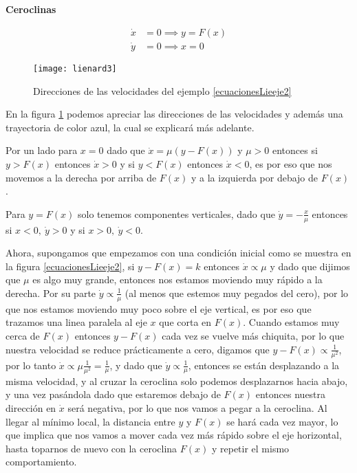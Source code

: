 \begin{ejemplo}
	\textbf{Ceroclinas}

	\begin{equation*}
		\begin{split}
			\dot{x} &= 0 \implies y = F(x) \\
			\dot{y} &= 0 \implies x=0 
		\end{split}
	\end{equation*}

	\begin{figure}[H]
		\centering
		\texttt{[image: lienard3]}
		\caption{Direcciones de las velocidades del ejemplo \ref{ecuacionesLieeje2} }
		\label{lienard3im} 
	\end{figure}
	En la figura \ref{lienard3im} podemos apreciar las direcciones de las velocidades y además una trayectoria de color azul, la cual se explicará más adelante.
\vspace{2mm}

	Por un lado para $x=0$ dado que $\dot{x}=\mu(y-F(x))$ y $ \mu > 0$ entonces si $y>F(x)$ entonces  $\dot{x}>0$ y si $y<F(x)$ entonces  $\dot{x}<0$, es por eso que nos movemos a la derecha por arriba de $F(x)$ y a la izquierda por debajo de  $F(x)$.
\vspace{2mm}

Para $y=F(x)$ solo tenemos componentes verticales, dado que $\dot{y}=-\frac{x}{\mu}$ entonces si $x<0,\ \dot{y}>0$ y si $x>0,\ \dot{y}<0$. 
\vspace{2mm}

Ahora, supongamos que empezamos con una condición inicial como se muestra en la figura \ref{ecuacionesLieeje2}, si $y-F(x) = k$ entonces  $ \dot{x} \propto \mu$ y dado que dijimos que $ \mu$ es algo muy grande, entonces nos estamos moviendo muy rápido a la derecha. Por su parte $\dot{y} \propto \frac{1}{\mu}$ (al menos que estemos muy pegados del cero), por lo que nos estamos moviendo muy poco sobre el eje vertical, es por eso que trazamos una linea paralela al eje $x$ que corta en  $F(x)$. Cuando estamos muy cerca de  $F(x)$ entonces  $y-F(x)$ cada vez se vuelve más chiquita, por lo que nuestra velocidad se reduce prácticamente a cero, digamos que  $y-F(x) \propto \frac{1}{\mu^2}$, por lo tanto $\dot{x} \propto \mu \frac{1}{\mu^2} = \frac{1}{\mu}$, y dado que $\dot{y} \propto \frac{1}{\mu}$, entonces se están desplazando a la misma velocidad, y al cruzar la ceroclina solo podemos desplazarnos hacia abajo, y una vez pasándola dado que estaremos debajo de $F(x)$ entonces nuestra dirección en  $\dot{x}$ será negativa, por lo que nos vamos a pegar a la ceroclina. Al llegar al mínimo local, la distancia entre $y$ y  $F(x)$ se hará cada vez mayor, lo que implica que nos vamos a mover cada vez más rápido sobre el eje horizontal, hasta toparnos de nuevo con la ceroclina  $F(x)$ y repetir el mismo comportamiento. 

	
\end{ejemplo}

